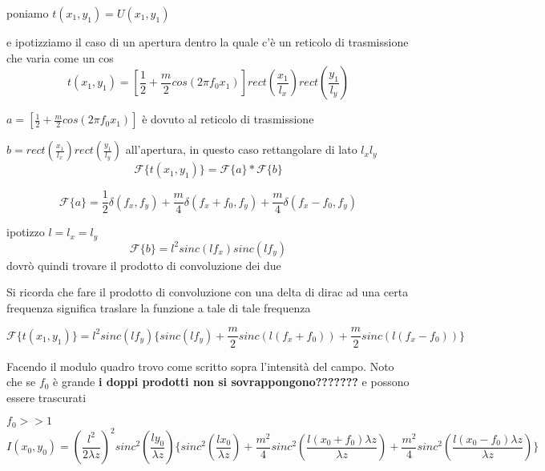 \documentclass{article}
\begin{document}
poniamo $t(x_{1}, y_{1}) =U(x_{1}, y_{1})$

e ipotizziamo il caso di un apertura dentro la quale c'è un reticolo di trasmissione che varia come un cos
\begin{equation}
t(x_{1}, y_{1}) = [\frac{1}{2} + \frac{m}{2} cos(2 \pi f_{0} x_{1})] rect(\frac{x_{1}}{l_{x}}) rect(\frac{y_{1}}{l_{y}})
\end{equation}

$a = [\frac{1}{2} + \frac{m}{2} cos(2 \pi f_{0} x_{1})]$ è dovuto al reticolo di trasmissione 

$b = rect(\frac{x_{1}}{l_{x}}) rect(\frac{y_{1}}{l_{y}})$ all'apertura, in questo caso rettangolare di lato $l_{x} l_{y}$ 
\begin{equation}
\mathscr{F} \{ t(x_{1},y_{1})\} = \mathscr{F} \{ a\} * \mathscr{F} \{b\}
\end{equation}


\begin{equation}
\mathscr{F} \{ a\} = \frac{1}{2} \delta(f_{x}, f_{y}) + \frac{m}{4} \delta(f_{x} + f_{0}, f_{y}) + \frac{m}{4} \delta(f_{x} - f_{0}, f_{y})
\end{equation}

ipotizzo $l=l_{x}=l_{y}$
\begin{equation}
\mathscr{F} \{ b\} = l^{2} sinc(l f_{x}) sinc(l f_{y})
\end{equation}
dovrò quindi trovare il prodotto di convoluzione dei due



Si ricorda che fare il prodotto di convoluzione con una delta di dirac ad una certa frequenza significa traslare la funzione a tale di tale frequenza

\begin{equation}
\mathscr{F} \{ t(x_{1},y_{1})\} = l^{2} sinc(l f_{y}) \{		sinc(l f_{y}) +  \frac{m}{2} sinc(l (f_{x} + f_{0}))	+  \frac{m}{2} sinc(l (f_{x} - f_{0}))\}
\end{equation}


Facendo il modulo quadro trovo come scritto sopra l'intensità del campo. Noto che se $f_{0}$ è grande \textbf{ i doppi prodotti non si sovrappongono???????} e possono essere trascurati

$f_{0}>>1$
\begin{equation}
I(x_{0},y_{0}) = (	\frac{l^{2}}{2 \lambda z}	)^{2}	sinc^{2}(\frac{l y_{0}}{ \lambda z}	)\{		sinc^{2}(\frac{l x_{0}}{ \lambda z}	)	+ \frac{m^{2}}{4} sinc^{2}(\frac{l (x_{0} + f_{0}) \lambda z}{ \lambda z}	)		+ \frac{m^{2}}{4} sinc^{2}(\frac{l (x_{0} - f_{0}) \lambda z}{ \lambda z}	)	\}
\end{equation} 
\end{document}
